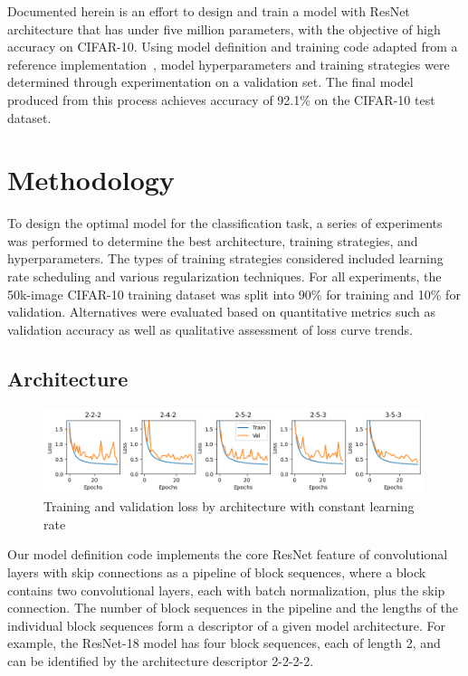 \documentclass[letterpaper]{article} %
\begin{document}
Documented herein is an effort to design and train a model with ResNet architecture that has under five
million parameters, with the objective of high accuracy on CIFAR-10.
Using model definition and training code adapted from a reference implementation~\cite{kl:2021}, model
hyperparameters and training strategies were determined through experimentation on a validation set.
The final model produced from this process achieves accuracy of 92.1\% on the CIFAR-10 test dataset.

\section{Methodology}

To design the optimal model for the classification task, a series of experiments was performed to
determine the best architecture, training strategies, and hyperparameters.
The types of training strategies considered included learning rate scheduling
and various regularization techniques.
For all experiments, the 50k-image CIFAR-10 training dataset was split into 90\% for training and 10\% for validation.
Alternatives were evaluated based on quantitative metrics such as validation accuracy as well as qualitative assessment
of loss curve trends.

\subsection{Architecture}

\begin{figure}[t]
\centering
\includegraphics[width=0.99\textwidth]{loss-curves-5}
\caption{Training and validation loss by architecture with constant learning rate}
\label{fig2}
\end{figure}

Our model definition code implements the core ResNet feature of convolutional layers with skip connections as a
pipeline of block sequences, where a block contains two convolutional layers, each with batch normalization, plus the
skip connection.
The number of block sequences in the pipeline and the lengths of the individual block sequences form a descriptor of a
given model architecture.
For example, the ResNet-18 model has four block sequences, each of length 2, and can be identified by the architecture
descriptor 2-2-2-2.
\end{document}
